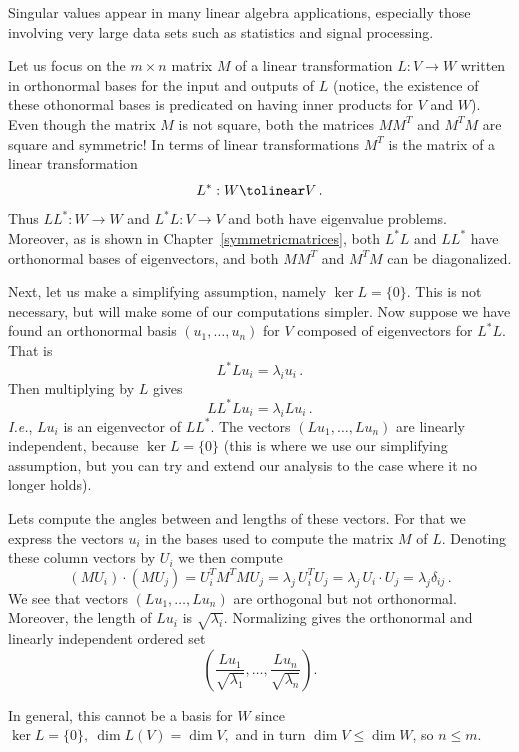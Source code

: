 Singular values appear in many linear algebra applications, especially those involving very large data sets such as statistics and signal processing. 

Let us focus on the $m\times n$ matrix $M$ of a linear transformation $L:V\to W$ written in orthonormal bases for the input and outputs of $L$ (notice, the existence of these othonormal bases is predicated on having inner products for $V$ and $W$).
Even though the matrix $M$ is not square, both the matrices $M M^T$ and $M^T M$ are square and symmetric! 
In terms of linear transformations $M^T$ is the matrix of a linear transformation 
\[
L^*:W\tolinear V\, .
\]
Thus $LL^*:W\to W$ and $L^*L:V\to V$ and both have eigenvalue problems.
Moreover,  as is shown  in Chapter~\ref{symmetricmatrices},  both $L^*L$ and $LL^*$ have orthonormal bases of eigenvectors, and
 both $MM^T$ and $M^TM$ can be diagonalized. 
 
Next, let us make a simplifying assumption, namely $\ker L=\{0\}$. This is not necessary, but will make some of our computations simpler.
Now suppose we have found an orthonormal basis $(u_1,\ldots , u_n)$ for $V$ composed of eigenvectors for $L^*L$. That is 
\[
L^*L u_i= \lambda_i u_i\, .
\]
Then multiplying by $L$ gives 
\[
L L^* L u_i = \lambda_i L u_i\, .
\]
{\it I.e.}, $L u_i$ is an eigenvector of $L L^*$.
The vectors $(Lu_1,\ldots, Lu_n)$ are linearly independent, because $\ker L=\{0\}$ (this is where we use our simplifying assumption, but you can 
try and extend our analysis to the case where it no longer holds). 

Lets compute the angles between and lengths of these vectors. 
For that we express the vectors $u_i$ in the bases used to compute the matrix $M$ of $L$. Denoting these column vectors by $U_i$ we then compute
\[
(MU_i)\cdot (MU_j)=U_i^T M^T M U_j = \lambda_j \, U_i^T U_j=\lambda_j \, U_i\cdot U_j = \lambda_j \delta_{ij}\, .
\]
We see that  vectors $(Lu_1,\ldots, Lu_n)$ are orthogonal but not orthonormal. Moreover, the length of $Lu_i$ is $\sqrt{\lambda_i}$.
Normalizing gives the orthonormal and linearly independent ordered set
\[
\left(\frac{Lu_1}{\sqrt{\lambda_1}},\ldots,\frac{Lu_n}{\sqrt{\lambda_n}}\right).
\]

In general, this cannot be a basis for $W$ 
since $\ker L=\{0\},~\dim L(V)=\dim V,$
and in turn $\dim V\leq \dim W$, so $n\leq m$. 

